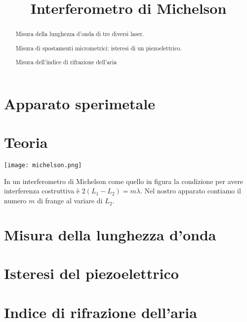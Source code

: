 \documentclass[a4paper]{article}
\begin{document}
	\title{Interferometro di Michelson}
	\maketitle
	
	\begin{abstract}
		 Misura della lunghezza d'onda di tre diversi laser.
		 
		 Misura di spostamenti micrometrici: isteresi di un piezoelettrico.
		 
		 Misura dell'indice di rifrazione dell'aria
	\end{abstract}

\section{Apparato sperimetale}

\section{Teoria}
\begin{center}
	\begin{minipage}[c]{.50\textwidth}
		\centering
		\texttt{[image: michelson.png]}
	\end{minipage}
	\begin{minipage}[c]{.40\textwidth}
		In un interferometro di Michelson come quello in figura la condizione per avere interferenza costruttiva è $2(L_1 -L_2) = m \lambda$. Nel nostro apparato contiamo il numero $m$ di frange al variare di $L_2$. 
	\end{minipage}
\end{center}
	

\section{Misura della lunghezza d'onda}

\section{Isteresi del piezoelettrico}

\section{Indice di rifrazione dell'aria}
\end{document}

